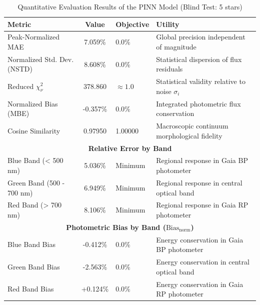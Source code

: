 
\begin{table}[htpb]
\centering
\caption{Quantitative Evaluation Results of the PINN Model (Blind Test: 5 stars)}
\label{tab:pinn_evaluation}
\begin{tabular}{lcll}
\hline
\textbf{Metric} & \textbf{Value} & \textbf{Objective} & \textbf{Utility} \\
\hline
Peak-Normalized MAE & 7.059\% & 0.0\% & Global precision independent of magnitude \\
Normalized Std. Dev. (NSTD) & 8.608\% & 0.0\% & Statistical dispersion of flux residuals \\
Reduced $\chi^2_\nu$ & 378.860 & $\approx 1.0$ & Statistical validity relative to noise $\sigma_i$ \\
Normalized Bias (MBE) & -0.357\% & 0.0\% & Integrated photometric flux conservation \\
Cosine Similarity & 0.97950 & 1.00000 & Macroscopic continuum morphological fidelity \\
\hline
\multicolumn{4}{c}{\textbf{Relative Error by Band}} \\
\hline
Blue Band (< 500 nm) & 5.036\% & Minimum & Regional response in Gaia BP photometer \\
Green Band (500 - 700 nm) & 6.949\% & Minimum & Regional response in central optical band \\
Red Band (> 700 nm) & 8.106\% & Minimum & Regional response in Gaia RP photometer \\
\hline
\multicolumn{4}{c}{\textbf{Photometric Bias by Band ($\text{Bias}_{\text{norm}}$)}} \\
\hline
Blue Band Bias & -0.412\% & 0.0\% & Energy conservation in Gaia BP photometer \\
Green Band Bias & -2.563\% & 0.0\% & Energy conservation in central optical band \\
Red Band Bias & +0.124\% & 0.0\% & Energy conservation in Gaia RP photometer \\
\hline
\end{tabular}
\end{table}
